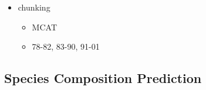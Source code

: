 \documentclass[12pt]{article}
\begin{document}
%
%



{\color{red}
\begin{itemize}
\item chunking
	\begin{itemize}
	\item MCAT
	\item 78-82, 83-90, 91-01
	\end{itemize}
\end{itemize}
}

%
%
\subsection{Species Composition Prediction}\label{prediction}
%
%
\end{document}
